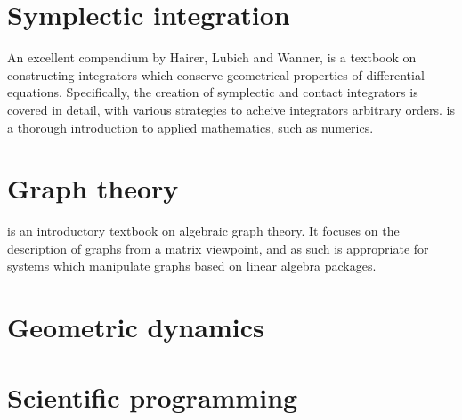 \documentclass[utf,a4paper,12pt]{report}
\begin{document}
\section{Symplectic integration}
An excellent compendium by Hairer, Lubich and Wanner, \cite{Hairer} is a textbook on constructing integrators which conserve geometrical properties of differential equations. Specifically, the creation of symplectic and contact integrators is covered in detail, with various strategies to acheive integrators arbitrary orders. \cite{Holmes2009} is a thorough introduction to applied mathematics, such as numerics.
\section{Graph theory}
\cite{Knauer2011} is an introductory textbook on algebraic graph theory. It focuses on the description of graphs from a matrix viewpoint, and as such is appropriate for systems which manipulate graphs based on linear algebra packages.
\section{Geometric dynamics}
\section{Scientific programming}



\nocite{*}
\end{document}
